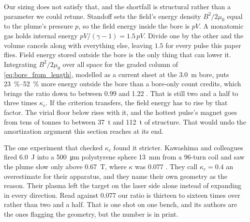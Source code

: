\documentclass{article}
\begin{document}
Our sizing does not satisfy that, and the shortfall is structural rather than a parameter we could retune. Standoff sets the field's energy density $B^2/2\mu_0$ equal to the plume's pressure $p$, so the field energy inside the bore is $pV$. A monatomic gas holds internal energy $pV/(\gamma-1) = 1.5\,pV$. Divide one by the other and the volume cancels along with everything else, leaving $1.5$ for every pulse this paper flies. Field energy stored outside the bore is the only thing that can lower it. Integrating $B^2/2\mu_0$ over all space for the graded column of \autoref{eq:bore_from_length}, modelled as a current sheet at the \SI{3.0}{\meter} bore, puts \SIrange{23}{52}{\percent} more energy outside the bore than a bore-only count credits, which brings the ratio down to between \num{0.99} and \num{1.22} \cite{Katz_aim_is_all_you_need_2025}. That is still two and a half to three times $\kappa_c$. If the criterion transfers, the field energy has to rise by that factor. The virial floor below rises with it, and the hottest pulse's magnet goes from tens of tonnes to between \SI{37}{\tonne} and \SI{112}{\tonne} of structure. That would undo the amortization argument this section reaches at its end.

The one experiment that checked $\kappa_c$ found it stricter. Kawashima and colleagues fired \SI{6.0}{\joule} into a \SI{500}{\micro\meter} polystyrene sphere \SI{13}{\milli\meter} from a 96-turn coil and saw the plume slow only above \SI{0.67}{\tesla}, where $\kappa$ was \num{0.077} \cite{kawashima2016structure}. They call $\kappa_c = 0.4$ an overestimate for their apparatus, and they name their own geometry as the reason. Their plasma left the target on the laser side alone instead of expanding in every direction. Read against \num{0.077} our ratio is thirteen to sixteen times over rather than two and a half. That is one shot on one bench, and its authors are the ones flagging the geometry, but the number is in print.
\end{document}

